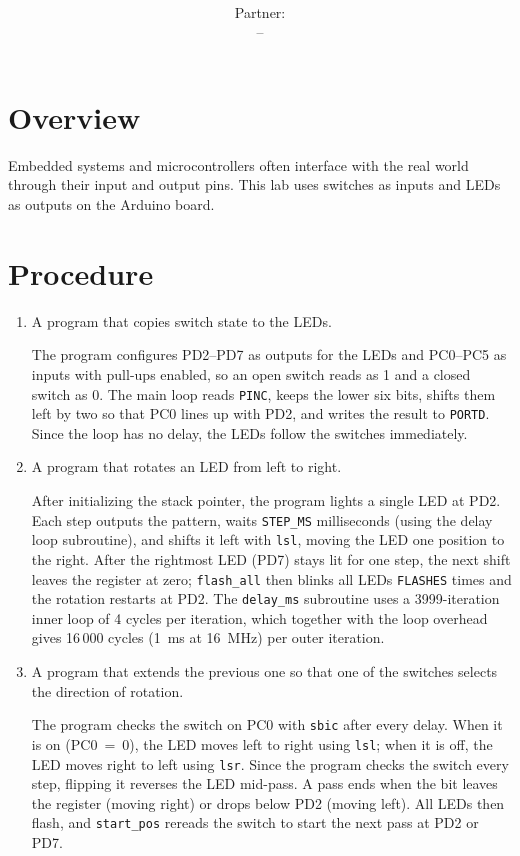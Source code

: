 \documentclass[11pt]{article}
\title{\labtitle \\[0.3em] \large \labdate}
\author{\studentname \\ \small Partner: \partners \\ \small \course{} \,--\, \instructor}
\date{}
\begin{document}
\maketitle

\section{Overview}
Embedded systems and microcontrollers often interface with the real world through their input and output pins. This lab uses switches as inputs and LEDs as outputs on the Arduino board.


\section{Procedure}
\begin{enumerate}
\item A program that copies switch state to the LEDs.

The program configures PD2--PD7 as outputs for the LEDs and PC0--PC5 as inputs with pull-ups enabled, so an open switch reads as 1 and a closed switch as 0. The main loop reads \texttt{PINC}, keeps the lower six bits, shifts them left by two so that PC0 lines up with PD2, and writes the result to \texttt{PORTD}. Since the loop has no delay, the LEDs follow the switches immediately.

\item A program that rotates an LED from left to right.

After initializing the stack pointer, the program lights a single LED at PD2. Each step outputs the pattern, waits \texttt{STEP\_MS} milliseconds (using the delay loop subroutine), and shifts it left with \texttt{lsl}, moving the LED one position to the right. After the rightmost LED (PD7) stays lit for one step, the next shift leaves the register at zero; \texttt{flash\_all} then blinks all LEDs \texttt{FLASHES} times and the rotation restarts at PD2. The \texttt{delay\_ms} subroutine uses a 3999-iteration inner loop of 4 cycles per iteration, which together with the loop overhead gives 16\,000 cycles (1~ms at 16~MHz) per outer iteration.

\item A program that extends the previous one so that one of the switches selects the direction of rotation.

The program checks the switch on PC0 with \texttt{sbic} after every delay. When it is on (PC0~=~0), the LED moves left to right using \texttt{lsl}; when it is off, the LED moves right to left using \texttt{lsr}. Since the program checks the switch every step, flipping it reverses the LED mid-pass. A pass ends when the bit leaves the register (moving right) or drops below PD2 (moving left). All LEDs then flash, and \texttt{start\_pos} rereads the switch to start the next pass at PD2 or PD7.


\end{enumerate}
\end{document}
